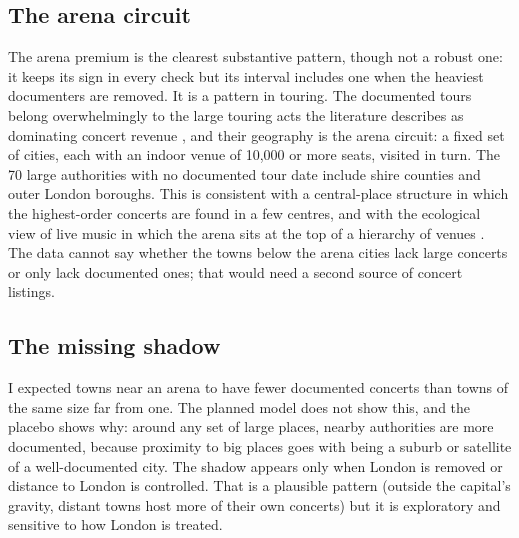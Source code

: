 \documentclass[11pt,a4paper]{article}
\begin{document}
\subsection{The arena circuit}
The arena premium is the clearest substantive pattern, though not a robust one: it keeps its sign in every check but its interval includes one when the heaviest documenters are removed. It is a pattern in touring. The documented tours belong overwhelmingly to the large touring acts the literature describes as dominating concert revenue \citep{krueger2005,connolly2006}, and their geography is the arena circuit: a fixed set of cities, each with an indoor venue of 10,000 or more seats, visited in turn. The 70 large authorities with no documented tour date include shire counties and outer London boroughs. This is consistent with a central-place structure in which the highest-order concerts are found in a few centres, and with the ecological view of live music in which the arena sits at the top of a hierarchy of venues \citep{behr2016}. The data cannot say whether the towns below the arena cities lack large concerts or only lack documented ones; that would need a second source of concert listings.

\subsection{The missing shadow}
I expected towns near an arena to have fewer documented concerts than towns of the same size far from one. The planned model does not show this, and the placebo shows why: around any set of large places, nearby authorities are more documented, because proximity to big places goes with being a suburb or satellite of a well-documented city. The shadow appears only when London is removed or distance to London is controlled. That is a plausible pattern (outside the capital's gravity, distant towns host more of their own concerts) but it is exploratory and sensitive to how London is treated.
\end{document}
